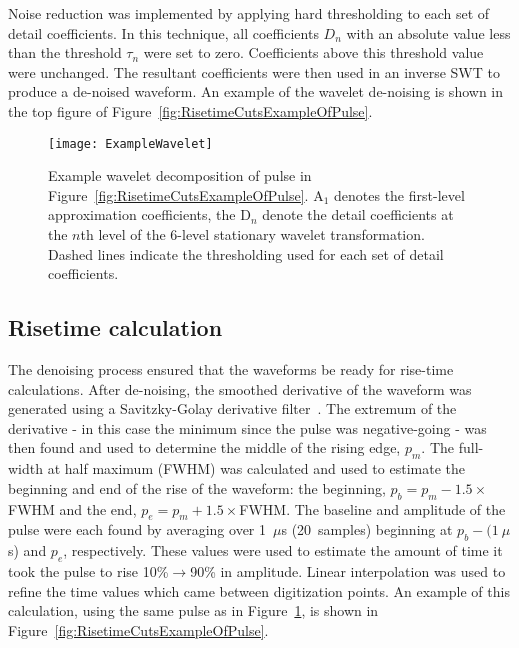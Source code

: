 Noise reduction was implemented by applying hard thresholding to each set of detail coefficients.  In this technique, all coefficients $D_{n}$ with an absolute value less than the threshold $\tau_{n}$ were set to zero.  Coefficients above this threshold value were unchanged.  The resultant coefficients were then used in an inverse SWT to produce a de-noised waveform.  An example of the wavelet de-noising is shown in the top figure of Figure~\ref{fig:RisetimeCutsExampleOfPulse}.
	
			
				\begin{figure}
					\centering
					\texttt{[image: ExampleWavelet]}
					\caption[Example wavelet decomposition of pulse]
					{Example wavelet decomposition of pulse in Figure~\ref{fig:RisetimeCutsExampleOfPulse}.  
					A$_{1}$ denotes the first-level
					 approximation coefficients, the D$_{n}$ denote the detail coefficients at the $n$th level of the 6-level stationary wavelet 
					 transformation.  Dashed lines indicate the thresholding used for each set of detail coefficients.}
					\label{fig:RisetimeCutsWaveletDecompositionOfPulse}
				\end{figure}					

		\subsection{Risetime calculation}
		\label{sec:RisetimeCalculation}
	The denoising process ensured that the waveforms be ready for rise-time calculations.  After de-noising, the smoothed derivative of the waveform was generated using a Savitzky-Golay derivative filter~\cite{Sav64aa}.  The extremum of the derivative - in this case the minimum since the pulse was negative-going - was then found and used to determine the middle of the rising edge, $p_{m}$.  The full-width at half maximum (FWHM) was calculated and used to estimate the beginning and end of the rise of the waveform: the beginning, $p_{b} = p_{m} - 1.5\times$FWHM and the end, $p_{e} = p_{m} + 1.5\times$FWHM.  The baseline and amplitude of the pulse were each found by averaging over 1~$\mu$s (20~samples) beginning at $p_{b} - (1~\mu$s) and $p_{e}$, respectively.  These values were used to estimate the amount of time it took the pulse to rise 10\%$\to$90\% in amplitude.  Linear interpolation was used to refine the time values which came between digitization points.  An example of this calculation, using the same pulse as in Figure~\ref{fig:RisetimeCutsWaveletDecompositionOfPulse}, is shown in Figure~\ref{fig:RisetimeCutsExampleOfPulse}.  
		
